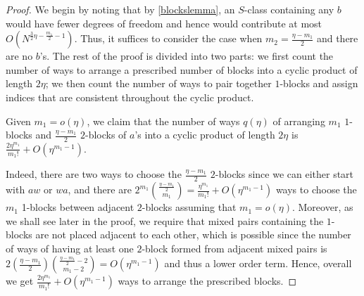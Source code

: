 \documentclass[11pt,reqno]{amsart}
\numberwithin{equation}{section}
\theoremstyle{plain}
\begin{document}
\begin{proof}
We begin by noting that by \ref{blockslemma}, an $S$-class containing any $b$ would have fewer degrees of freedom and hence would contribute at most $O(N^{\frac{3}{2}\eta-\frac{m_1}{2}-1})$. Thus, it suffices to consider the case when $m_2=\frac{\eta-m_1}{2}$ and there are no $b$'s. The rest of the proof is divided into two parts: we first count the number of ways to arrange a prescribed number of blocks into a cyclic product of length $2\eta$; we then count the number of ways to pair together $1$-blocks and assign indices that are consistent throughout the cyclic product.

Given $m_1=o(\eta)$, we claim that the number of ways $q(\eta)$ of arranging $m_1$ $1$-blocks and $\frac{\eta-m_1}{2}$ $2$-blocks of $a$'s into a cyclic product of length $2\eta$ is $\frac{2\eta^{m_1}}{m_1!}+O(\eta^{m_1-1})$.

Indeed, there are two ways to choose the $\frac{\eta-m_1}{2}$ $2$-blocks since we can either start with $aw$ or $wa$, and there are $2^{m_1}\binom{\frac{\eta-m_1}{2}}{m_1}=\frac{\eta^{m_1}}{m_1!} + O(\eta^{m_1-1})$ ways to choose the $m_1$ 1-blocks between adjacent $2$-blocks assuming that $m_1=o(\eta)$. Moreover, as we shall see later in the proof, we require that mixed pairs containing the $1$-blocks are not placed adjacent to each other, which is possible since the number of ways of having at least one $2$-block formed from adjacent mixed pairs is $2\left(\frac{\eta-m_1}{2}\right)\binom{\frac{\eta-m_1}{2}-2}{m_1-2}=O(\eta^{m_1-1})$ and thus a lower order term. Hence, overall we get $\frac{2\eta^{m_1}}{m_1!}+O(\eta^{m_1-1})$ ways to arrange the prescribed blocks.



\end{proof}
\end{document}
